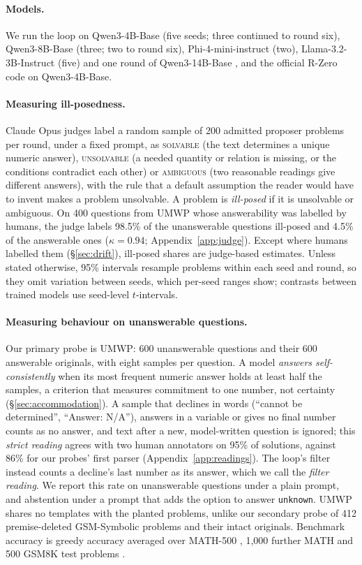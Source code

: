 \paragraph{Models.} We run the loop on Qwen3-4B-Base (five seeds; three continued to round six), Qwen3-8B-Base (three; two to round six), Phi-4-mini-instruct (two), Llama-3.2-3B-Instruct (five) and one round of Qwen3-14B-Base \citep{yang2025qwen3,abouelenin2025phi4mini,grattafiori2024llama3}, and the official R-Zero code on Qwen3-4B-Base.

\paragraph{Measuring ill-posedness.} Claude Opus judges label a random sample of 200 admitted proposer problems per round, under a fixed prompt, as \textsc{solvable} (the text determines a unique numeric answer), \textsc{unsolvable} (a needed quantity or relation is missing, or the conditions contradict each other) or \textsc{ambiguous} (two reasonable readings give different answers), with the rule that a default assumption the reader would have to invent makes a problem unsolvable. A problem is \emph{ill-posed} if it is unsolvable or ambiguous. On 400 questions from UMWP \citep{sun2024umwp} whose answerability was labelled by humans, the judge labels 98.5\% of the unanswerable questions ill-posed and 4.5\% of the answerable ones ($\kappa{=}0.94$; Appendix~\ref{app:judge}). Except where humans labelled them (\S\ref{sec:drift}), ill-posed shares are judge-based estimates. Unless stated otherwise, 95\% intervals resample problems within each seed and round, so they omit variation between seeds, which per-seed ranges show; contrasts between trained models use seed-level $t$-intervals.

\paragraph{Measuring behaviour on unanswerable questions.} Our primary probe is UMWP: 600 unanswerable questions and their 600 answerable originals, with eight samples per question. A model \emph{answers self-consistently} when its most frequent numeric answer holds at least half the samples, a criterion that measures commitment to one number, not certainty (\S\ref{sec:accommodation}). A sample that declines in words (``cannot be determined'', ``Answer: N/A''), answers in a variable or gives no final number counts as no answer, and text after a new, model-written question is ignored; this \emph{strict reading} agrees with two human annotators on 95\% of solutions, against 86\% for our probes' first parser (Appendix~\ref{app:readings}). The loop's filter instead counts a decline's last number as its answer, which we call the \emph{filter reading}. We report this rate on unanswerable questions under a plain prompt, and abstention under a prompt that adds the option to answer \texttt{unknown}. UMWP shares no templates with the planted problems, unlike our secondary probe of 412 premise-deleted GSM-Symbolic problems and their intact originals. Benchmark accuracy is greedy accuracy averaged over MATH-500 \citep{hendrycks2021math,lightman2024verify}, 1,000 further MATH and 500 GSM8K test problems \citep{cobbe2021gsm8k}.


